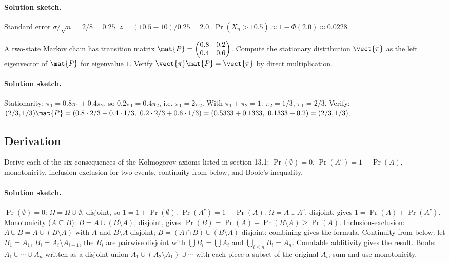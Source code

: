 \paragraph{Solution sketch.}
Standard error $\sigma/\sqrt{n} = 2/8 = 0.25$. $z = (10.5 - 10)/
0.25 = 2.0$. $\Pr(\bar X_{n} > 10.5) \approx 1 - \Phi(2.0) \approx
0.0228$.

\begin{exercise}
A two-state Markov chain has transition matrix
$\mat{P} = \begin{pmatrix} 0.8 & 0.2 \\ 0.4 & 0.6 \end{pmatrix}$.
Compute the stationary distribution $\vect{\pi}$ as the left
eigenvector of $\mat{P}$ for eigenvalue $1$. Verify $\vect{\pi}
\mat{P} = \vect{\pi}$ by direct multiplication.
\end{exercise}

\paragraph{Solution sketch.}
Stationarity: $\pi_{1} = 0.8 \pi_{1} + 0.4 \pi_{2}$, so $0.2 \pi_{1}
= 0.4 \pi_{2}$, i.e. $\pi_{1} = 2 \pi_{2}$. With $\pi_{1} + \pi_{2}
= 1$: $\pi_{2} = 1/3$, $\pi_{1} = 2/3$. Verify:
$(2/3, 1/3)\mat{P} = (0.8 \cdot 2/3 + 0.4 \cdot 1/3,\ 0.2 \cdot 2/3
+ 0.6 \cdot 1/3) = (0.5333 + 0.1333,\ 0.1333 + 0.2) = (2/3, 1/3)$.

\subsection*{Derivation}

\begin{exercise}
Derive each of the six consequences of the Kolmogorov axioms listed
in section 13.1: $\Pr(\emptyset) = 0$, $\Pr(A^{c}) = 1 - \Pr(A)$,
monotonicity, inclusion-exclusion for two events, continuity from
below, and Boole's inequality.
\end{exercise}

\paragraph{Solution sketch.}
$\Pr(\emptyset) = 0$: $\Omega = \Omega \cup \emptyset$, disjoint, so
$1 = 1 + \Pr(\emptyset)$. $\Pr(A^{c}) = 1 - \Pr(A)$: $\Omega = A
\cup A^{c}$, disjoint, gives $1 = \Pr(A) + \Pr(A^{c})$.
Monotonicity ($A \subseteq B$): $B = A \cup (B \setminus A)$,
disjoint, gives $\Pr(B) = \Pr(A) + \Pr(B \setminus A) \geq \Pr(A)$.
Inclusion-exclusion: $A \cup B = A \cup (B \setminus A)$ with $A$
and $B \setminus A$ disjoint; $B = (A \cap B) \cup (B \setminus A)$
disjoint; combining gives the formula. Continuity from below: let
$B_{1} = A_{1}$, $B_{i} = A_{i} \setminus A_{i-1}$, the $B_{i}$ are
pairwise disjoint with $\bigcup B_{i} = \bigcup A_{i}$ and
$\bigcup_{i \leq n} B_{i} = A_{n}$. Countable additivity gives the
result. Boole: $A_{1} \cup \cdots \cup A_{n}$ written as a disjoint
union $A_{1} \cup (A_{2} \setminus A_{1}) \cup \cdots$ with each
piece a subset of the original $A_{i}$; sum and use monotonicity.

